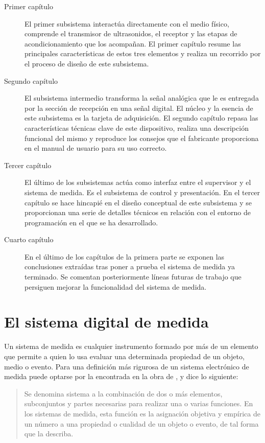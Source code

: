 \begin{description}
    \item[Primer capítulo] El primer subsistema interactúa directamente con
	el medio físico, comprende el transmisor de ultrasonidos, el
	receptor y las etapas de acondicionamiento que los acompañan. El
	primer capítulo resume las principales características de estos
	tres elementos y realiza un recorrido por el proceso de diseño de
	este subsistema.
    \item[Segundo capítulo] El subsistema intermedio transforma la señal
	analógica que le es entregada por la sección de recepción en una
	señal digital. El núcleo y la esencia de este subsistema es la
	tarjeta de adquisición. El segundo capítulo repasa las
	características técnicas clave de este dispositivo, realiza una
	descripción funcional del mismo y reproduce los consejos que el
	fabricante proporciona en el manual de usuario para su uso
	correcto.
    \item[Tercer capítulo] El último de los subsistemas actúa como interfaz
	entre el supervisor y el sistema de medida. Es el subsistema de
	control y presentación. En el tercer capítulo se hace hincapié en
	el diseño conceptual de este subsistema y se proporcionan una serie
	de detalles técnicos en relación con el entorno de programación en
	el que se ha desarrollado.
    \item[Cuarto capítulo] En el último de los capítulos de la primera
	parte se exponen las conclusiones extraídas tras poner a prueba el
	sistema de medida ya terminado. Se comentan posteriormente líneas
	futuras de trabajo que persiguen mejorar la funcionalidad del
	sistema de medida.
\end{description}


\section*{El sistema digital de medida}

Un sistema de medida es cualquier instrumento formado por más de un
elemento que permite a quien lo usa evaluar una determinada propiedad de un
objeto, medio o evento. Para una definición más rigurosa de un sistema
electrónico de medida puede optarse por la encontrada en la obra de
\citet{pallas2004sas}, y dice lo siguiente:

{\small\begin{quotation}
    Se denomina sistema a la combinación de dos o más elementos,
    subconjuntos y partes necesarias para realizar una o varias
    funciones. En los sistemas de medida, esta función es la asignación
    objetiva y empírica de un número a una propiedad o cualidad de un
    objeto o evento, de tal forma que la describa.
\end{quotation}}


